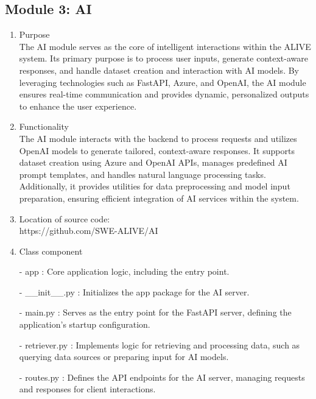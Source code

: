 \documentclass[conference]{IEEEtran}
\begin{document}
\begin{enumerate}
\begin{itemize}
\begin{itemize}
\begin{enumerate}
\subsection{Module 3: AI}
\begin{enumerate}
    \item Purpose\\
    The AI module serves as the core of intelligent interactions within the ALIVE system. Its primary purpose is to process user inputs, generate context-aware responses, and handle dataset creation and interaction with AI models. By leveraging technologies such as FastAPI, Azure, and OpenAI, the AI module ensures real-time communication and provides dynamic, personalized outputs to enhance the user experience. \\
    \item Functionality\\
    The AI module interacts with the backend to process requests and utilizes OpenAI models to generate tailored, context-aware responses. It supports dataset creation using Azure and OpenAI APIs, manages predefined AI prompt templates, and handles natural language processing tasks. Additionally, it provides utilities for data preprocessing and model input preparation, ensuring efficient integration of AI services within the system. \\
    \item Location of source code:\\ https://github.com/SWE-ALIVE/AI \\
    \item Class component
        
        \item[-] app : Core application logic, including the entry point.\\
        \item[-] \_\_init\_\_.py : Initializes the app package for the AI server.\\
        \item[-] main.py : Serves as the entry point for the FastAPI server, defining the application’s startup configuration.\\
        \item[-] retriever.py : Implements logic for retrieving and processing data, such as querying data sources or preparing input for AI models.\\
        \item[-] routes.py : Defines the API endpoints for the AI server, managing requests and responses for client interactions.\\
        

\end{enumerate}
\end{enumerate}
\end{itemize}
\end{itemize}
\end{enumerate}
\end{document}
